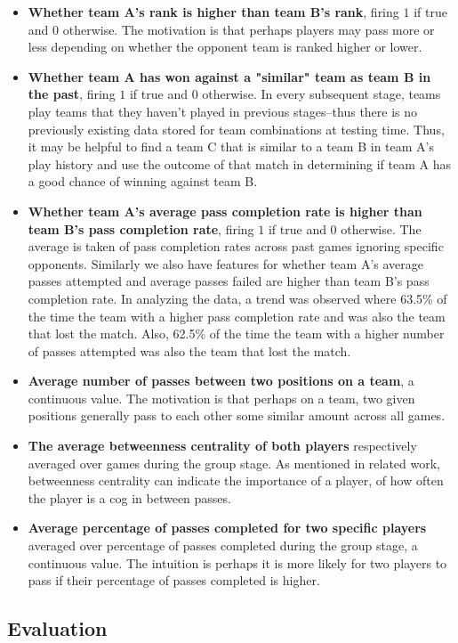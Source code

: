 \documentclass[11pt,letterpaper]{article}
\begin{document}
\begin{itemize}
\item \textbf{Whether team A's rank is higher than team B's rank}, firing $1$ if true and $0$ otherwise. The motivation is that perhaps players may pass more or less depending on whether the opponent team is ranked higher or lower. 
\item \textbf{Whether team A has won against a "similar" team as team B in the past}, firing $1$ if true and $0$ otherwise. In every subsequent stage, teams play teams that they haven't played in previous stages--thus there is no previously existing data stored for team combinations at testing time. Thus, it may be helpful to find a team C that is similar to a team B in team A's play history and use the outcome of that match in determining if team A has a good chance of winning against team B.
\item \textbf{Whether team A's average pass completion rate is higher than team B's pass completion rate}, firing $1$ if true and $0$ otherwise. The average is taken of pass completion rates across past games ignoring specific opponents. Similarly we also have features for whether team A's average passes attempted and average passes failed are higher than team B's pass completion rate. In analyzing the data, a trend was observed where 63.5\% of the time the team with a higher pass completion rate and was also the team that lost the match. Also, 62.5\% of the time the team with a higher number of passes attempted was also the team that lost the match.    
\item \textbf{Average number of passes between two positions on a team}, a continuous value. The motivation is that perhaps on a team, two given positions generally pass to each other some similar amount across all games.
\item \textbf{The average betweenness centrality of both players} respectively averaged over games during the group stage. As mentioned in related work, betweenness centrality can indicate the importance of a player, of how often the player is a cog in between passes.
\item \textbf{Average percentage of passes completed for two specific players} averaged over percentage of passes completed during the group stage, a continuous value. The intuition is perhaps it is more likely for two players to pass if their percentage of passes completed is higher.
\end{itemize}

\subsection{Evaluation}
\end{document}
